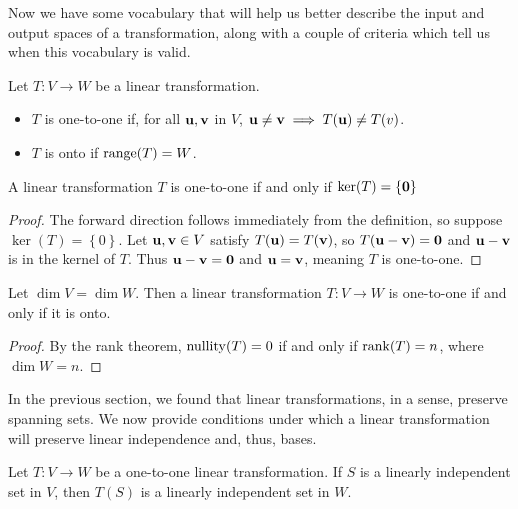 \documentclass[../m073main.tex]{subfiles}
\begin{document}
Now we have some vocabulary that will help us better describe the input and output spaces of a transformation, along with a couple of criteria which tell us when this vocabulary is valid.

\begin{definition}
	Let $T : V \to W$ be a linear transformation.
	\begin{itemize}
		\item $T$ is one-to-one if, for all $\mathbf{u}, \mathbf{v}$ in $V$, $\mathbf{u} \neq \mathbf{v} \implies T(\mathbf{u}) \neq T(v)$.
		\item $T$ is onto if $\operatorname{range}(T) = W$.
	\end{itemize}
\end{definition}

\begin{theorem}
	A linear transformation $T$ is one-to-one if and only if $\operatorname{ker}(T) = \{\mathbf{0}\}$
\end{theorem}

\begin{proof}
	The forward direction follows immediately from the definition, so suppose $\ker(T) = \left\{ 0 \right\}$.
	Let $\mathbf{u}, \mathbf{v} \in V$ satisfy $T(\mathbf{u}) = T(\mathbf{v})$, so $T(\mathbf{u} - \mathbf{v}) = \mathbf{0}$ and $\mathbf{u} - \mathbf{v}$ is in the kernel of $T$.
	Thus $\mathbf{u} - \mathbf{v} = \mathbf{0}$ and $\mathbf{u} = \mathbf{v}$, meaning $T$ is one-to-one.
\end{proof}

\begin{theorem}
	Let $\dim V = \dim W$.
	Then a linear transformation $T : V \to W$ is one-to-one if and only if it is onto.
\end{theorem}

\begin{proof}
	By the rank theorem, $\operatorname{nullity}(T) = 0$ if and only if $\operatorname{rank}(T) = n$, where $\dim W = n$.
\end{proof}

In the previous section, we found that linear transformations, in a sense, preserve spanning sets.
We now provide conditions under which a linear transformation will preserve linear independence and, thus, bases.

\begin{theorem}
	Let $T : V \to W$ be a one-to-one linear transformation.
	If $S$ is a linearly independent set in $V$, then $T(S)$ is a linearly independent set in $W$.
\end{theorem}
\end{document}
